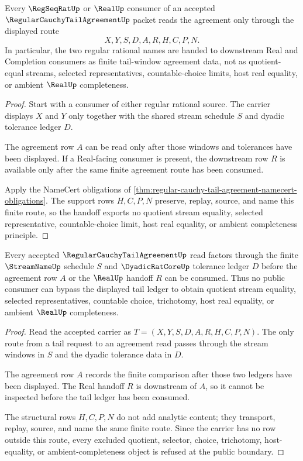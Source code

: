 \begin{theorem}
\label{thm:regular-cauchy-tail-agreement-regseqrat-handoff}
Every $\RegSeqRatUp$ or $\RealUp$ consumer of an accepted $\RegularCauchyTailAgreementUp$ packet reads the agreement only through the displayed route
$$
X,Y,S,D,A,R,H,C,P,N .
$$
In particular, the two regular rational names are handed to downstream Real and Completion consumers as finite tail-window agreement data, not as quotient-equal streams, selected representatives, countable-choice limits, host real equality, or ambient $\RealUp$ completeness.
\end{theorem}
\begin{proof}
Start with a consumer of either regular rational source. The carrier displays $X$ and $Y$ only together with the shared stream schedule $S$ and dyadic tolerance ledger $D$.

The agreement row $A$ can be read only after those windows and tolerances have been displayed. If a Real-facing consumer is present, the downstream row $R$ is available only after the same finite agreement route has been consumed.

Apply the NameCert obligations of \autoref{thm:regular-cauchy-tail-agreement-namecert-obligations}. The support rows $H,C,P,N$ preserve, replay, source, and name this finite route, so the handoff exports no quotient stream equality, selected representative, countable-choice limit, host real equality, or ambient completeness principle.
\end{proof}

\begin{theorem}
\label{thm:regular-cauchy-tail-agreement-ledger-nonescape}
Every accepted $\RegularCauchyTailAgreementUp$ read factors through the finite $\StreamNameUp$ schedule $S$ and $\DyadicRatCoreUp$ tolerance ledger $D$ before the agreement row $A$ or the $\RealUp$ handoff $R$ can be consumed. Thus no public consumer can bypass the displayed tail ledger to obtain quotient stream equality, selected representatives, countable choice, trichotomy, host real equality, or ambient $\RealUp$ completeness.
\end{theorem}
\begin{proof}
Read the accepted carrier as $T=(X,Y,S,D,A,R,H,C,P,N)$. The only route from a tail request to an agreement read passes through the stream windows in $S$ and the dyadic tolerance data in $D$.

The agreement row $A$ records the finite comparison after those two ledgers have been displayed. The Real handoff $R$ is downstream of $A$, so it cannot be inspected before the tail ledger has been consumed.

The structural rows $H,C,P,N$ do not add analytic content; they transport, replay, source, and name the same finite route. Since the carrier has no row outside this route, every excluded quotient, selector, choice, trichotomy, host-equality, or ambient-completeness object is refused at the public boundary.
\end{proof}

